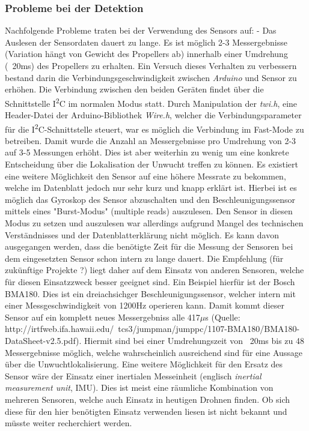 \subsubsection*{Probleme bei der Detektion}
Nachfolgende Probleme traten bei der Verwendung des Sensors auf:
- Das Auslesen der Sensordaten dauert zu lange. Es ist möglich 2-3 Messergebnisse (Variation hängt von Gewicht des Propellers ab) innerhalb einer Umdrehung (~20ms) des Propellers zu erhalten. Ein Versuch dieses Verhalten zu verbessern bestand darin die Verbindungsgeschwindigkeit zwischen \textit{Arduino} und Sensor zu erhöhen. Die Verbindung zwischen den beiden Geräten findet über die Schnittstelle I\textsuperscript{2}C im normalen Modus statt. Durch Manipulation der \textit{twi.h}, eine Header-Datei der Arduino-Bibliothek \textit{Wire.h}, welcher die Verbindungsparameter für die I\textsuperscript{2}C-Schnittstelle steuert, war es möglich die Verbindung im Fast-Mode zu betreiben. Damit wurde die Anzahl an Messergebnisse pro Umdrehung von 2-3 auf 3-5 Messungen erhöht. Dies ist aber weiterhin zu wenig um eine konkrete Entscheidung über die Lokalisation der Unwucht treffen zu können.
Es existiert eine weitere Möglichkeit den Sensor auf eine höhere Messrate zu bekommen, welche im Datenblatt jedoch nur sehr kurz und knapp erklärt ist. Hierbei ist es möglich das Gyroskop des Sensor abzuschalten und den Beschleunigungssensor mittels eines "Burst-Modus" (multiple reads) auszulesen. Den Sensor in diesen Modus zu setzen und auszulesen war allerdings aufgrund Mangel des technischen Verständnisses und der Datenblatterklärung nicht möglich.
Es kann davon ausgegangen werden, dass die benötigte Zeit für die Messung der Sensoren bei dem eingesetzten Sensor schon intern zu lange dauert. Die Empfehlung (für zukünftige Projekte ?) liegt daher auf dem Einsatz von anderen Sensoren, welche für diesen Einsatzzweck besser geeignet sind. Ein Beispiel hierfür ist der Bosch BMA180. Dies ist ein dreiachsichger Beschleunigungssensor, welcher intern mit einer Messgeschwindigkeit von 1200Hz operieren kann. Damit kommt dieser Sensor auf ein komplett neues Messergebniss alle 417$\mu$s (Quelle: http://irtfweb.ifa.hawaii.edu/~tcs3/jumpman/jumppc/1107-BMA180/BMA180-DataSheet-v2.5.pdf). Hiermit sind bei einer Umdrehungszeit von ~20ms bis zu 48 Messergebnisse möglich, welche wahrscheinlich ausreichend sind für eine Aussage über die Unwuchtlokalisierung. Eine weitere Möglichkeit für den Ersatz des Sensor wäre der Einsatz einer inertialen Messeinheit (englisch \textit{inertial measurement unit}, IMU). Dies ist meist eine räumliche Kombination von mehreren Sensoren, welche auch Einsatz in heutigen Drohnen finden. Ob sich diese für den hier benötigten Einsatz verwenden liesen ist nicht bekannt und müsste weiter recherchiert werden.
